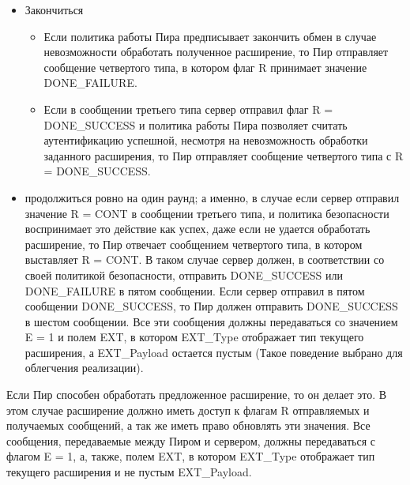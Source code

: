 \begin{itemize}
\item Закончиться
\begin{itemize}
\item Если политика работы Пира предписывает закончить обмен в случае невозможности обработать полученное расширение, то Пир отправляет сообщение четвертого типа, в котором флаг R принимает значение DONE\_FAILURE.
\item Если в сообщении третьего типа сервер отправил флаг R = DONE\_SUCCESS и политика работы Пира позволяет считать аутентификацию успешной, несмотря на невозможность обработки заданного расширения, то Пир отправляет сообщение четвертого типа с R = DONE\_SUCCESS.
\end{itemize}
\item продолжиться ровно на один раунд; а именно, в случае если сервер отправил значение R = CONT в сообщении третьего типа, и политика безопасности воспринимает это действие как успех, даже если не удается обработать расширение, то Пир отвечает сообщением четвертого типа, в котором выставляет R = CONT. В таком случае сервер должен, в соответствии со своей политикой безопасности, отправить DONE\_SUCCESS или DONE\_FAILURE в пятом сообщении. Если сервер отправил в пятом сообщении DONE\_SUCCESS, то Пир должен отправить DONE\_SUCCESS в шестом сообщении. Все эти сообщения должны передаваться со значением E = 1 и полем EXT, в котором EXT\_Type отображает тип текущего расширения, а EXT\_Payload остается пустым (Такое поведение выбрано для облегчения реализации).
\end{itemize}

Если Пир способен обработать предложенное расширение, то он делает это. В этом случае расширение должно иметь доступ к флагам R отправляемых и получаемых сообщений, а так же иметь право обновлять эти значения. Все сообщения, передаваемые между Пиром и сервером, должны передаваться с флагом E = 1, а, также, полем EXT, в котором EXT\_Type отображает тип текущего расширения и не пустым EXT\_Payload.
